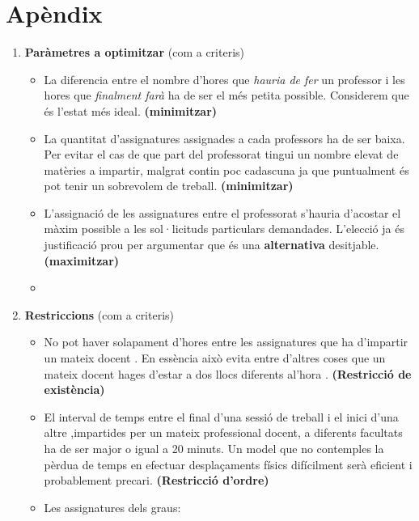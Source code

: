 \documentclass[10pt]{proc}
\begin{document}
\section*{Apèndix}
\begin{enumerate}
	\item \textbf{Paràmetres a optimitzar } (com a criteris) 
	\begin{itemize}
		\item La diferencia entre el nombre d'hores que \textit{hauria de fer} un professor i les hores que \textit{finalment farà} ha de ser el més petita possible. {\color{gray} Considerem que és l'estat més ideal.} \textbf{(minimitzar)} 
		\item La quantitat d'assignatures assignades a cada professors ha de ser baixa. 
		{\color{gray}  Per evitar el cas de que part del professorat tingui un nombre elevat de matèries a impartir, malgrat contin poc cadascuna ja que puntualment és pot tenir un sobrevolem de treball.} \textbf{(minimitzar)}
		\item L'assignació de les assignatures entre el professorat s'hauria d'acostar el màxim possible a les sol·licituds particulars demandades. {\color{gray}  L'elecció ja és justificació prou per argumentar que és una \textbf{alternativa} desitjable.} \textbf{(maximitzar)}
		\item 
	\end{itemize}
    \item \textbf{Restriccions} (com a criteris)
    \begin{itemize}
    	\item No pot haver solapament d'hores entre les assignatures que ha d'impartir un mateix docent . {\color{gray} En essència això evita entre d'altres coses que un mateix docent hages d'estar a dos llocs diferents al'hora .} \textbf{(Restricció de existència)} 
    	\item El interval de temps entre el final d'una sessió de treball i el inici d'una altre ,impartides per un mateix professional docent, a diferents facultats ha de ser major o igual a 20 minuts. {\color{gray} Un model que no contemples la pèrdua de temps en efectuar desplaçaments físics difícilment serà eficient i probablement precari.} \textbf{(Restricció d'ordre)} 
    	\item Les assignatures dels graus:

\end{itemize}
\end{enumerate}
\end{document}
